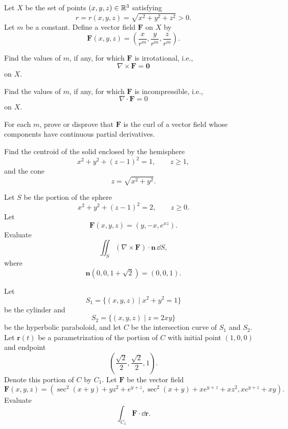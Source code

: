 \begin{problem}
Let $X$ be the set of points $(x, y, z)\in\mathbb{R}^3$ satisfying
\[
r=r(x, y, z)=\sqrt{x^2+y^2+z^2}>0.
\]
Let $m$ be a constant. Define a vector field $\mathbf F$ on $X$ by
\[
\mathbf F(x, y, z)
=
\left(\frac{x}{r^m}, \frac{y}{r^m}, \frac{z}{r^m}\right).
\]
\begin{problemsubparts}
\item Find the values of $m$, if any, for which $\mathbf F$ is irrotational, i.e.,
\[
\nabla\times\mathbf F=\mathbf0
\]
on $X$.
\item Find the values of $m$, if any, for which $\mathbf F$ is incompressible, i.e.,
\[
\nabla\cdot\mathbf F=0
\]
on $X$.
\item For each $m$, prove or disprove that $\mathbf F$ is the curl of a vector field whose components have continuous partial derivatives.
\end{problemsubparts}
\end{problem}

\begin{problem}
Find the centroid of the solid enclosed by the hemisphere
\[
x^2+y^2+(z-1)^2=1,
\qquad
z\ge1,
\]
and the cone
\[
z=\sqrt{x^2+y^2}.
\]
\end{problem}

\begin{problem}
Let $S$ be the portion of the sphere
\[
x^2+y^2+(z-1)^2=2,
\qquad
z\ge0.
\]
Let
\[
\mathbf F(x, y, z)=(y, -x, e^{xz}).
\]
Evaluate
\[
\iint_S(\nabla\times\mathbf F)\cdot\mathbf n\,\dd S,
\]
where
\[
\mathbf n(0, 0, 1+\sqrt2)=(0, 0, 1).
\]
\end{problem}

\begin{problem}
Let
\[
S_1=\{(x, y, z)\mid x^2+y^2=1\}
\]
be the cylinder and
\[
S_2=\{(x, y, z)\mid z=2xy\}
\]
be the hyperbolic paraboloid, and let $C$ be the intersection curve of $S_1$ and $S_2$. Let $\mathbf r(t)$ be a parametrization of the portion of $C$ with initial point $(1, 0, 0)$ and endpoint
\[
\left(\frac{\sqrt2}{2}, \frac{\sqrt2}{2}, 1\right).
\]
Denote this portion of $C$ by $C_1$. Let $\mathbf F$ be the vector field
\[
\mathbf F(x, y, z)
=
\left(
\sec^2(x+y)+yz^2+e^{y+z},
\sec^2(x+y)+xe^{y+z}+xz^2,
xe^{y+z}+xy
\right).
\]
Evaluate
\[
\int_{C_1}\mathbf F\cdot\dd\mathbf r.
\]
\end{problem}


